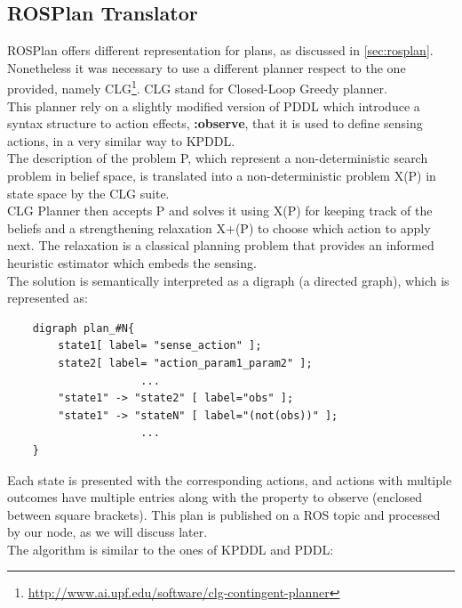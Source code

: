 \documentclass[pdftex,12pt,a4paper]{report}
\begin{document}
\newpage
\subsection{ROSPlan Translator}\label{sec:digraph_transl}
ROSPlan offers different representation for plans, as discussed in \ref{sec:rosplan}. \\
Nonetheless it was necessary to use a different planner respect to the one provided, namely CLG\cite{clg}\footnote{\url{http://www.ai.upf.edu/software/clg-contingent-planner}}. 
CLG stand for Closed-Loop Greedy planner. \\
This planner rely on a slightly modified version of PDDL which introduce a syntax structure to action effects, \textbf{:observe}, that it is used to define sensing actions, in a very similar way to KPDDL.\\
The description of the problem P, which represent a non-deterministic search problem in belief space, is translated into a non-deterministic problem X(P) in state space by the CLG suite.\\
CLG Planner then accepts P and solves it using X(P) for keeping track of the beliefs and a strengthening relaxation X+(P) to choose which action to apply next.
The relaxation is a classical planning problem that provides an informed heuristic
estimator which embeds the sensing. \\
The solution is semantically interpreted as a digraph (a directed graph), which is represented as:
\begin{verbatim}
    digraph plan_#N{
        state1[ label= "sense_action" ];
        state2[ label= "action_param1_param2" ];
                     ...
        "state1" -> "state2" [ label="obs" ];
        "state1" -> "stateN" [ label="(not(obs))" ];
                     ...
    }
\end{verbatim}
Each state is presented with the corresponding actions, and actions with multiple outcomes have multiple entries along with the property to observe (enclosed between square brackets).
This plan is published on a ROS topic and processed by our node, as we will discuss later.\\
The algorithm is similar to the ones of KPDDL and PDDL:\\
\end{document}
